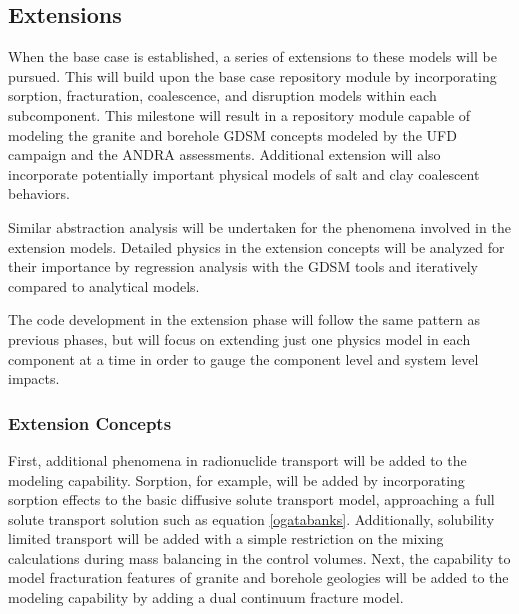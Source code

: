 \subsection{Extensions}


When the base case is established, a series of extensions to these models will 
be pursued.  This will build upon the base case repository module by 
incorporating sorption, fracturation, coalescence, and disruption 
models within each subcomponent.  This milestone will result in a repository 
module capable of modeling the granite and borehole \gls{GDSM} concepts modeled 
by the \gls{UFD} campaign and the \gls{ANDRA} assessments. Additional extension 
will also incorporate potentially important physical models of salt and clay
coalescent behaviors. 

Similar abstraction analysis will be undertaken for the phenomena involved in 
the extension models.  Detailed physics in the extension concepts will be
analyzed for their importance by regression analysis with the \gls{GDSM} 
tools and iteratively compared to analytical models.

The code development in the extension phase will follow the same pattern as 
previous phases, but will focus on extending just one physics model in each 
component at a time in order to gauge the component level and system level 
impacts.

\subsubsection{Extension Concepts}


    
    First, additional phenomena in radionuclide transport will be added to the 
    modeling capability. Sorption, for example, will be added by incorporating 
    sorption effects to the basic diffusive solute transport model, approaching  
    a full solute transport solution such as equation \eqref{ogatabanks}. 
    Additionally, solubility limited transport will be added with a simple 
    restriction on the mixing calculations during mass balancing in the control 
    volumes. Next, the capability to model fracturation features of granite and
    borehole geologies will be added  to the modeling capability by adding a dual 
    continuum fracture model.  



